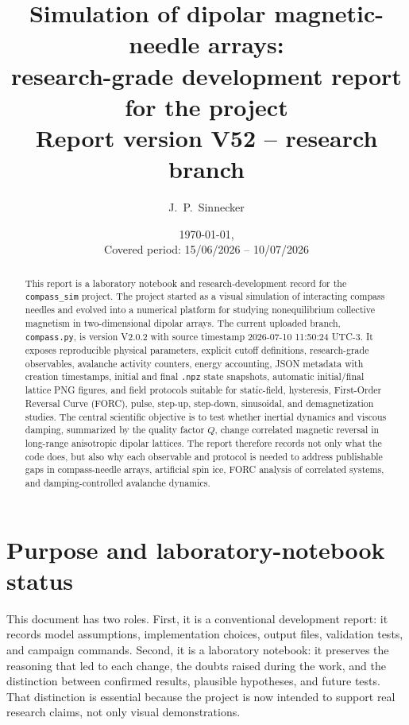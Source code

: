 \documentclass[11pt,a4paper]{article}
\title{\textbf{Simulation of dipolar magnetic-needle arrays:\\
research-grade development report for the \code{compass\_sim} project}\\[1ex]
\large Report version V52 -- \code{compass.py}  research branch}
\author{J.~P.~Sinnecker}
\date{\today, \hhmm\\[0.5ex]
\small Covered period: 15/06/2026 -- 10/07/2026}
\newcommand{\code}[1]{\texttt{#1}}
\begin{document}
\maketitle

\begin{abstract}
\noindent
This report is a laboratory notebook and research-development record for the \code{compass\_sim} project. The project started as a visual simulation of interacting compass needles and evolved into a numerical platform for studying nonequilibrium collective magnetism in two-dimensional dipolar arrays. The current uploaded branch, \code{compass.py}, is version V2.0.2 with source timestamp 2026-07-10 11:50:24 UTC-3. It exposes reproducible physical parameters, explicit cutoff definitions, research-grade observables, avalanche activity counters, energy accounting, JSON metadata with creation timestamps, initial and final \code{.npz} state snapshots, automatic initial/final lattice PNG figures, and field protocols suitable for static-field, hysteresis, First-Order Reversal Curve (FORC), pulse, step-up, step-down, sinusoidal, and demagnetization studies. The central scientific objective is to test whether inertial dynamics and viscous damping, summarized by the quality factor $Q$, change correlated magnetic reversal in long-range anisotropic dipolar lattices. The report therefore records not only what the code does, but also why each observable and protocol is needed to address publishable gaps in compass-needle arrays, artificial spin ice, FORC analysis of correlated systems, and damping-controlled avalanche dynamics.
\end{abstract}

\tableofcontents
\newpage

\section{Purpose and laboratory-notebook status}

This document has two roles. First, it is a conventional development report: it records model assumptions, implementation choices, output files, validation tests, and campaign commands. Second, it is a laboratory notebook: it preserves the reasoning that led to each change, the doubts raised during the work, and the distinction between confirmed results, plausible hypotheses, and future tests. That distinction is essential because the project is now intended to support real research claims, not only visual demonstrations.
\end{document}
